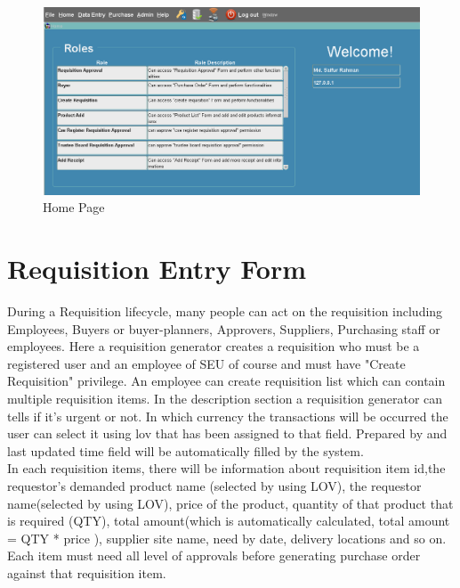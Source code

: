 \documentclass[12pt]{report} %
\begin{document}
\begin{landscape}
\begin{figure}[h]
		\begin{center}
			\includegraphics[width=1.5\textwidth]{pic/home_page.png}
		\end{center}
	\caption{Home Page}
	\label{fig:home_page}
\end{figure}
\thispagestyle{empty} 
\end{landscape}
\clearpage
\fi

\section{Requisition Entry Form}
During a Requisition lifecycle, many people can act on the requisition including Employees, Buyers or buyer-planners, Approvers, Suppliers, Purchasing staff or employees. Here a requisition generator creates a requisition who must be a registered user and an employee of SEU of course and must have "Create Requisition" privilege. An employee can create requisition list which can contain multiple requisition items. In the description section a requisition generator can tells if it's urgent or not. In which currency the transactions will be occurred the user can select it using lov that has been assigned to that field. Prepared by and last updated time field will be automatically filled by the system.\\

In each requisition items, there will be information about requisition item id,the requestor's demanded product name (selected by using LOV), the requestor name(selected by using LOV), price of the product, quantity of that product that is required (QTY), total amount(which is automatically calculated, total amount = QTY * price ), supplier site name, need by date, delivery locations and so on. Each item must need all level of approvals before generating purchase order against that requisition item.\\
\end{document}
